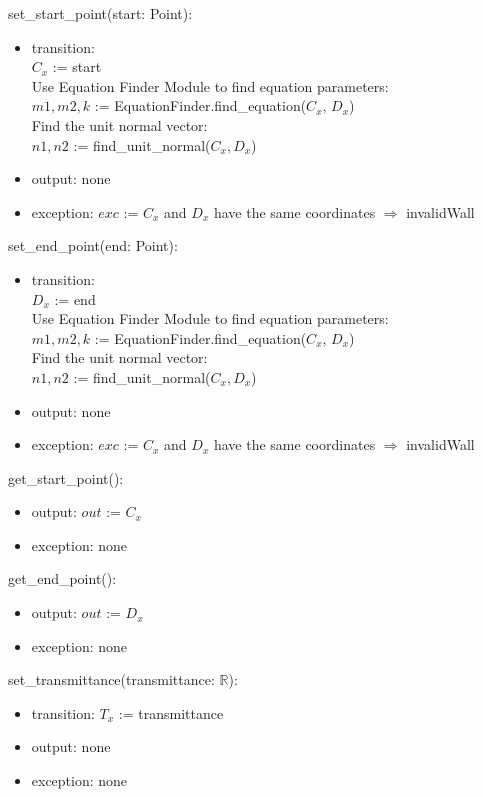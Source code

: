 \documentclass[12pt, titlepage]{article}
\begin{document}
\noindent set\_start\_point(start: Point):
\begin{itemize}
\item transition: \\
$C_x$ := start\\

Use Equation Finder Module to find equation parameters:\\
$m1, m2, k$ := EquationFinder.find\_equation($C_x$, $D_x$)\\

Find the unit normal vector:\\
$n1, n2$ := find\_unit\_normal($C_x, D_x$)\\
\item output: none
\item exception: $exc$ := $C_x$ and $D_x$ have the same coordinates $\Rightarrow$ invalidWall
\end{itemize}

\noindent set\_end\_point(end: Point):
\begin{itemize}
\item transition: \\
$D_x$ := end\\

Use Equation Finder Module to find equation parameters:\\
$m1, m2, k$ := EquationFinder.find\_equation($C_x$, $D_x$)\\

Find the unit normal vector:\\
$n1, n2$ := find\_unit\_normal($C_x, D_x$)\\
\item output: none
\item exception: $exc$ := $C_x$ and $D_x$ have the same coordinates $\Rightarrow$ invalidWall
\end{itemize}

\noindent get\_start\_point():
\begin{itemize}
\item output: $out$ := $C_x$
\item exception: none
\end{itemize}

\noindent get\_end\_point():
\begin{itemize}
\item output: $out$ := $D_x$
\item exception: none
\end{itemize}

\noindent set\_transmittance(transmittance: $\mathbb{R}$):
\begin{itemize}
\item transition: $T_x$ := transmittance
\item output: none
\item exception: none
\end{itemize}
\end{document}
